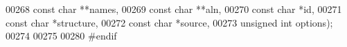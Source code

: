 \begin{DoxyCode}
00268                     \textcolor{keyword}{const} \textcolor{keywordtype}{char}    **names,
00269                     \textcolor{keyword}{const} \textcolor{keywordtype}{char}    **aln,
00270                     \textcolor{keyword}{const} \textcolor{keywordtype}{char}    *\textcolor{keywordtype}{id},
00271                     \textcolor{keyword}{const} \textcolor{keywordtype}{char}    *structure,
00272                     \textcolor{keyword}{const} \textcolor{keywordtype}{char}    *source,
00273                     \textcolor{keywordtype}{unsigned} \textcolor{keywordtype}{int}  options);
00274 
00275 
00280 \textcolor{preprocessor}{#endif}
\end{DoxyCode}
